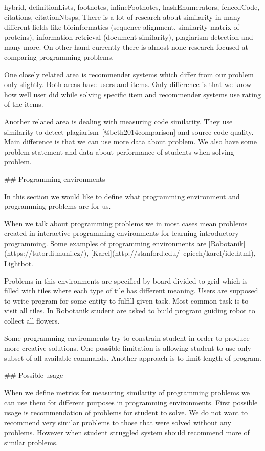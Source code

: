 \documentclass[
  digital, %
  table,   %
  nolof,     %
  nolot,     %
  nocover
]{fithesis3}
\begin{document}
\begin{markdown*}{%
  hybrid,
  definitionLists,
  footnotes,
  inlineFootnotes,
  hashEnumerators,
  fencedCode,
  citations,
  citationNbsps,
}
There is a lot of research about similarity in many different fields like bioinformatics (sequence alignment, similarity matrix of proteins), information retrieval (document similarity), plagiarism detection and many more. On other hand currently there is almost none research focused at comparing programming problems.

One closely related area is recommender systems which differ from our problem only slightly. Both areas have users and items. Only difference is that we know how well user did while solving specific item and recommender systems use rating of the items.

Another related area is dealing with measuring code similarity. They use similarity to detect plagiarism~[@beth2014comparison] and source code quality. Main difference is that we can use more data about problem. We also have some problem statement and data about performance of students when solving problem.

## Programming environments

In this section we would like to define what programming environment and programming problems are for us.

When we talk about programming problems we in most cases mean problems created in interactive programming environments for learning introductory programming. Some examples of programming environments are [Robotanik](https://tutor.fi.muni.cz/), [Karel](http://stanford.edu/~cpiech/karel/ide.html), Lightbot.

Problems in this environments are specified by board divided to grid which is filled with tiles where each type of tile has different meaning. Users are supposed to write program for some entity to fulfill given task. Most common task is to visit all  tiles. In Robotanik student are asked to build program guiding robot to collect all flowers.

Some programming environments try to constrain student in order to produce more creative solutions. One possible limitation is allowing student to use only subset of all available commands. Another approach is to limit length of program.

## Possible usage

When we define metrics for measuring similarity of programming problems we can use them for different purposes in programming environments. First possible usage is recommendation of problems for student to solve. We do not want to recommend very similar problems to those that were solved without any problems. However when student struggled system should recommend more of similar problems.


\end{markdown*}
\end{document}
